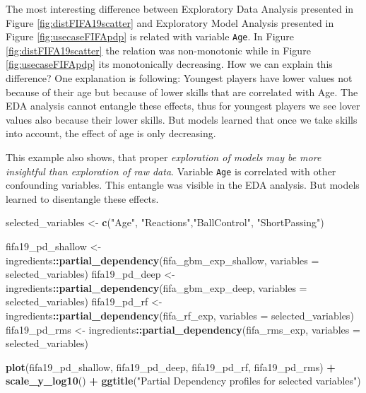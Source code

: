 \documentclass[12pt,]{krantz}
\newenvironment{Shaded}{\begin{snugshade}}{\end{snugshade}}
\newcommand{\DataTypeTok}[1]{\textcolor[rgb]{0.13,0.29,0.53}{#1}}
\newcommand{\KeywordTok}[1]{\textcolor[rgb]{0.13,0.29,0.53}{\textbf{#1}}}
\newcommand{\NormalTok}[1]{#1}
\newcommand{\OperatorTok}[1]{\textcolor[rgb]{0.81,0.36,0.00}{\textbf{#1}}}
\newcommand{\StringTok}[1]{\textcolor[rgb]{0.31,0.60,0.02}{#1}}
\begin{document}
The most interesting difference between Exploratory Data Analysis presented in Figure \ref{fig:distFIFA19scatter} and Exploratory Model Analysis presented in Figure \ref{fig:usecaseFIFApdp} is related with variable \texttt{Age}. In Figure \ref{fig:distFIFA19scatter} the relation was non-monotonic while in Figure \ref{fig:usecaseFIFApdp} its monotonically decreasing.
How we can explain this difference?
One explanation is following: Youngest players have lower values not because of their age but because of lower skills that are correlated with Age. The EDA analysis cannot entangle these effects, thus for youngest players we see lover values also because their lower skills. But models learned that once we take skills into account, the effect of age is only decreasing.

This example also shows, that proper \emph{exploration of models may be more insightful than exploration of raw data}. Variable \texttt{Age} is correlated with other confounding variables. This entangle was visible in the EDA analysis. But models learned to disentangle these effects.

\begin{Shaded}
\begin{Highlighting}[]
\NormalTok{selected_variables <-}\StringTok{ }\KeywordTok{c}\NormalTok{(}\StringTok{"Age"}\NormalTok{, }\StringTok{"Reactions"}\NormalTok{,}\StringTok{"BallControl"}\NormalTok{, }\StringTok{"ShortPassing"}\NormalTok{)}

\NormalTok{fifa19_pd_shallow <-}\StringTok{ }\NormalTok{ingredients}\OperatorTok{::}\KeywordTok{partial_dependency}\NormalTok{(fifa_gbm_exp_shallow, }\DataTypeTok{variables =}\NormalTok{ selected_variables)}
\NormalTok{fifa19_pd_deep <-}\StringTok{ }\NormalTok{ingredients}\OperatorTok{::}\KeywordTok{partial_dependency}\NormalTok{(fifa_gbm_exp_deep, }\DataTypeTok{variables =}\NormalTok{ selected_variables)}
\NormalTok{fifa19_pd_rf <-}\StringTok{ }\NormalTok{ingredients}\OperatorTok{::}\KeywordTok{partial_dependency}\NormalTok{(fifa_rf_exp, }\DataTypeTok{variables =}\NormalTok{ selected_variables)}
\NormalTok{fifa19_pd_rms <-}\StringTok{ }\NormalTok{ingredients}\OperatorTok{::}\KeywordTok{partial_dependency}\NormalTok{(fifa_rms_exp, }\DataTypeTok{variables =}\NormalTok{ selected_variables)}

\KeywordTok{plot}\NormalTok{(fifa19_pd_shallow, fifa19_pd_deep, fifa19_pd_rf, fifa19_pd_rms) }\OperatorTok{+}
\StringTok{  }\KeywordTok{scale_y_log10}\NormalTok{() }\OperatorTok{+}
\StringTok{  }\KeywordTok{ggtitle}\NormalTok{(}\StringTok{"Partial Dependency profiles for selected variables"}\NormalTok{)}
\end{Highlighting}
\end{Shaded}
\end{document}
